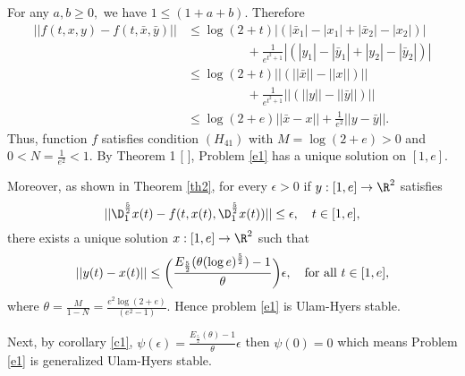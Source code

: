 For any $a,b\geq0,$ we have $1\leq(1+a+b).$ Therefore
\begin{align*}
||f(t,x,y)-f(t,\bar{x},\bar{y})||&\leq\log{(2+t)}|{(|\bar{x}_1|-|x_1|+|\bar{x}_2|-|x_2|)}|\\
&\hspace{2cm}+\frac{1}{e^{t^2+1}}|{(|y_1|-|\bar{y}_1|+|y_2|-|\bar{y}_2|)}|\\
&\leq\log{(2+t)}||(||\bar{x}||-||x||)||\\
&\hspace{2cm}+\frac{1}{e^{t^2+1}}||({||y||-||\bar{y}||})||\\
&\leq\log{(2+e)}||\bar{x}-x||+\frac{1}{e^{2}}||y-\bar{y}||.
\end{align*}
Thus, function $f$ satisfies condition $(H_{41})$ with $M=\log{(2+e)}>0$ and $0<N=\frac{1}{e^2}<1.$ By Theorem 1 [ ], Problem \eqref{e1} has a unique solution on $[1,e].$

Moreover, as shown in Theorem \ref{th2}, for every $\epsilon>0$ if $y:[1,e]\to{\R}^2$ satisfies
\begin{equation}\label{e3}
||\D_{1}^{\frac{5}{2}}x(t)-f(t,x(t),{\D_{1}^{\frac{5}{2}}x(t)})||\leq\epsilon,\quad t\in[1,e],
\end{equation}
there exists a unique solution $x:[1,e]\to{\R}^2$ such that
\begin{equation*}
||y(t)-x(t)||\leq\bigg(\frac{E_{\frac{5}{2}}(\theta(\log{e})^{\frac{5}{2}})-1}{\theta}\bigg)\epsilon,\quad \text{for\,\,all}\,\,t\in[1,e],
\end{equation*}
where $\theta=\frac{M}{1-N}=\frac{e^2\log{(2+e)}}{(e^2-1)}.$ Hence problem \eqref{e1} is Ulam-Hyers stable.

Next, by corollary \ref{c1}, $\psi(\epsilon)=\frac{E_{\frac{5}{2}}(\theta)-1}{\theta}\epsilon$ then $\psi(0)=0$ which means Problem \eqref{e1} is generalized Ulam-Hyers stable. 